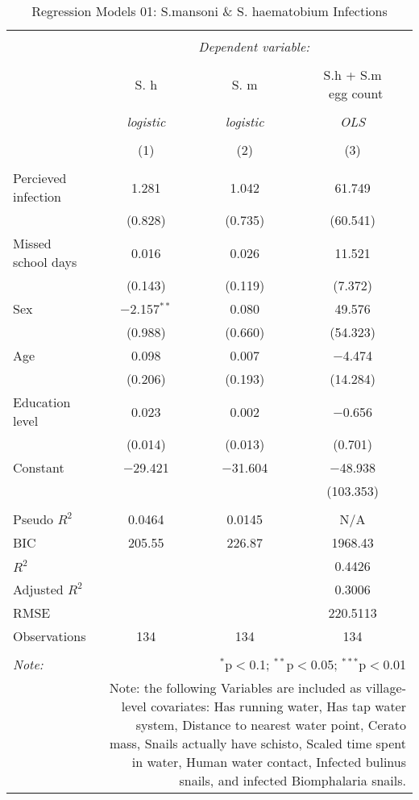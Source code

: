 
\begin{table}[!htbp] \centering 
  \caption{Regression Models 01: S.mansoni & S. haematobium Infections} 
  \label{} 
\begin{tabular}{@{\extracolsep{3pt}}lccc} 
\\[-1.8ex]\hline 
\hline \\[-1.8ex] 
 & \multicolumn{3}{c}{\textit{Dependent variable:}} \\ 
\cline{2-4} 
\\[-1.8ex] & S. h & S. m & \makecell{{S.h + S.m} \\ \ {egg count}} \\ 
\\[-1.8ex] & \textit{logistic} & \textit{logistic} & \textit{OLS} \\ 
\\[-1.8ex] & (1) & (2) & (3)\\ 
\hline \\[-1.8ex] 
 Percieved infection & 1.281 & 1.042 & 61.749 \\ 
  & (0.828) & (0.735) & (60.541) \\ 
  Missed school days & 0.016 & 0.026 & 11.521 \\ 
  & (0.143) & (0.119) & (7.372) \\ 
  Sex & $-$2.157$^{**}$ & 0.080 & 49.576 \\ 
  & (0.988) & (0.660) & (54.323) \\ 
  Age & 0.098 & 0.007 & $-$4.474 \\ 
  & (0.206) & (0.193) & (14.284) \\ 
  Education level & 0.023 & 0.002 & $-$0.656 \\ 
  & (0.014) & (0.013) & (0.701) \\ 
  Constant & $-$29.421 & $-$31.604 & $-$48.938 \\ 
  &  &  & (103.353) \\ 
 \hline \\[-1.8ex] 
Pseudo $R^2$ & 0.0464 & 0.0145 & N/A \\ 
BIC & 205.55 & 226.87 & 1968.43 \\ 
$R^2$ &  &  & 0.4426 \\ 
Adjusted $R^2$ &  &  & 0.3006 \\ 
RMSE &  &  & 220.5113 \\ 
Observations & 134 & 134 & 134 \\ 
\hline 
\hline \\[-1.8ex] 
\textit{Note:}  & \multicolumn{3}{r}{$^{*}$p$<$0.1; $^{**}$p$<$0.05; $^{***}$p$<$0.01} \\ 
 & \multicolumn{3}{r}{Note: the following Variables are included as village-level covariates: Has running water, Has tap water system, Distance to nearest water point, Cerato mass, Snails actually have schisto, Scaled time spent in water, Human water contact, Infected bulinus snails, and infected Biomphalaria snails.} \\ 
\end{tabular} 
\end{table} 
